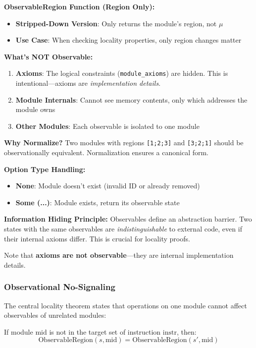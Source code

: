 \textbf{ObservableRegion Function (Region Only):}
\begin{itemize}
    \item \textbf{Stripped-Down Version}: Only returns the module's region, not $\mu$
    \item \textbf{Use Case}: When checking locality properties, only region changes matter
\end{itemize}

\textbf{What's NOT Observable:}
\begin{enumerate}
    \item \textbf{Axioms}: The logical constraints (\texttt{module\_axioms}) are hidden. This is intentional—axioms are \emph{implementation details}.
    \item \textbf{Module Internals}: Cannot see memory contents, only which addresses the module owns
    \item \textbf{Other Modules}: Each observable is isolated to one module
\end{enumerate}

\textbf{Why Normalize?} Two modules with regions \texttt{[1;2;3]} and \texttt{[3;2;1]} should be observationally equivalent. Normalization ensures a canonical form.

\textbf{Option Type Handling:}
\begin{itemize}
    \item \textbf{None}: Module doesn't exist (invalid ID or already removed)
    \item \textbf{Some (...)}: Module exists, return its observable state
\end{itemize}

\textbf{Information Hiding Principle:} Observables define an abstraction barrier. Two states with the same observables are \emph{indistinguishable} to external code, even if their internal axioms differ. This is crucial for locality proofs.

Note that \textbf{axioms are not observable}—they are internal implementation details.

\subsubsection{Observational No-Signaling}

The central locality theorem states that operations on one module cannot affect observables of unrelated modules:

\begin{theorem}
If module $\text{mid}$ is not in the target set of instruction $\text{instr}$, then:
\[
\text{ObservableRegion}(s, \text{mid}) = \text{ObservableRegion}(s', \text{mid})
\]
\end{theorem}

